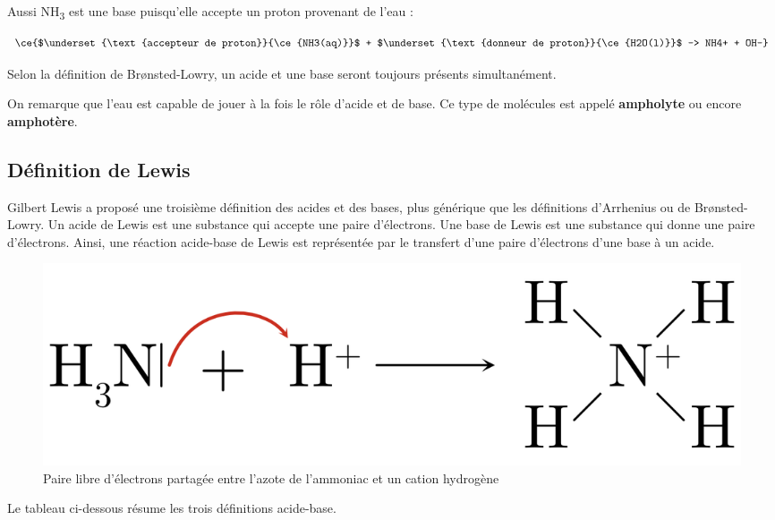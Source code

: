 \documentclass[
  11pt,
  a4paper,
  openany]{book}
\begin{document}
Aussi NH\textsubscript{3} est une base puisqu'elle accepte un proton provenant de l'eau :

\[
\ce{$\underset{\text{accepteur de proton}}{\ce{NH3(aq)}}$ + $\underset{\text{donneur de proton}}{\ce{H2O(l)}}$ -> NH4+ + OH-}
\]

Selon la définition de Brønsted-Lowry, un acide et une base seront toujours présents simultanément.

On remarque que l'eau est capable de jouer à la fois le rôle d'acide et de base. Ce type de molécules est appelé \textbf{ampholyte} ou encore \textbf{amphotère}.

\hypertarget{duxe9finition-de-lewis}{%
\subsection{Définition de Lewis}\label{duxe9finition-de-lewis}}

Gilbert Lewis a proposé une troisième définition des acides et des bases, plus générique que les définitions d'Arrhenius ou de Brønsted-Lowry. Un acide de Lewis est une substance qui accepte une paire d'électrons. Une base de Lewis est une substance qui donne une paire d'électrons. Ainsi, une réaction acide-base de Lewis est représentée par le transfert d'une paire d'électrons d'une base à un acide.

\begin{figure}

{\centering \includegraphics[width=0.33\linewidth]{images/acides-bases-2} 

}

\caption{Paire libre d'électrons partagée entre l'azote de l'ammoniac et un cation hydrogène}\label{fig:acides-bases-2}
\end{figure}
\clearpage

Le tableau ci-dessous résume les trois définitions acide-base.
\end{document}
